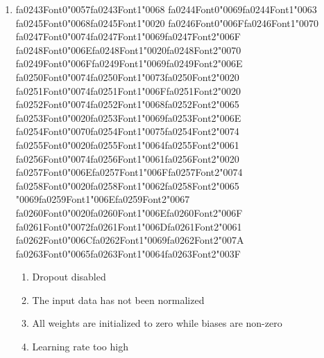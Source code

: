 \documentclass[12pt]{article}
\begin{document}
\begin{enumerate}[label=Q\arabic*.]
 \item {\csname fa0243Font0\endcsname\char"0057}{\csname fa0243Font1\endcsname\char"0068} {\csname fa0244Font0\endcsname\char"0069}{\csname fa0244Font1\endcsname\char"0063} {\csname fa0245Font0\endcsname\char"0068}{\csname fa0245Font1\endcsname\char"0020} {\csname fa0246Font0\endcsname\char"006F}{\csname fa0246Font1\endcsname\char"0070} {\csname fa0247Font0\endcsname\char"0074}{\csname fa0247Font1\endcsname\char"0069}{\csname fa0247Font2\endcsname\char"006F} {\csname fa0248Font0\endcsname\char"006E}{\csname fa0248Font1\endcsname\char"0020}{\csname fa0248Font2\endcsname\char"0070} {\csname fa0249Font0\endcsname\char"006F}{\csname fa0249Font1\endcsname\char"0069}{\csname fa0249Font2\endcsname\char"006E} {\csname fa0250Font0\endcsname\char"0074}{\csname fa0250Font1\endcsname\char"0073}{\csname fa0250Font2\endcsname\char"0020} {\csname fa0251Font0\endcsname\char"0074}{\csname fa0251Font1\endcsname\char"006F}{\csname fa0251Font2\endcsname\char"0020} {\csname fa0252Font0\endcsname\char"0074}{\csname fa0252Font1\endcsname\char"0068}{\csname fa0252Font2\endcsname\char"0065} {\csname fa0253Font0\endcsname\char"0020}{\csname fa0253Font1\endcsname\char"0069}{\csname fa0253Font2\endcsname\char"006E} {\csname fa0254Font0\endcsname\char"0070}{\csname fa0254Font1\endcsname\char"0075}{\csname fa0254Font2\endcsname\char"0074} {\csname fa0255Font0\endcsname\char"0020}{\csname fa0255Font1\endcsname\char"0064}{\csname fa0255Font2\endcsname\char"0061} {\csname fa0256Font0\endcsname\char"0074}{\csname fa0256Font1\endcsname\char"0061}{\csname fa0256Font2\endcsname\char"0020} {\csname fa0257Font0\endcsname\char"006E}{\csname fa0257Font1\endcsname\char"006F}{\csname fa0257Font2\endcsname\char"0074} {\csname fa0258Font0\endcsname\char"0020}{\csname fa0258Font1\endcsname\char"0062}{\csname fa0258Font2\endcsname\char"0065} {\char"0069}{\csname fa0259Font1\endcsname\char"006E}{\csname fa0259Font2\endcsname\char"0067} {\csname fa0260Font0\endcsname\char"0020}{\csname fa0260Font1\endcsname\char"006E}{\csname fa0260Font2\endcsname\char"006F} {\csname fa0261Font0\endcsname\char"0072}{\csname fa0261Font1\endcsname\char"006D}{\csname fa0261Font2\endcsname\char"0061} {\csname fa0262Font0\endcsname\char"006C}{\csname fa0262Font1\endcsname\char"0069}{\csname fa0262Font2\endcsname\char"007A} {\csname fa0263Font0\endcsname\char"0065}{\csname fa0263Font1\endcsname\char"0064}{\csname fa0263Font2\endcsname\char"003F}
 \begin{enumerate}[label=(\Alph*)]
     \item Dropout disabled
     \item The input data has not been normalized
     \item All weights are initialized to zero while biases are non-zero
     \item Learning rate too high
 \end{enumerate}
 

\end{enumerate}
\end{document}
